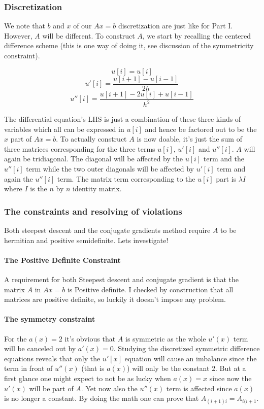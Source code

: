 \documentclass[a4paper,11pt]{article}
\begin{document}
\subsubsection{Discretization}

We note that $b$ and $x$ of our $Ax=b$ discretization are just like for
Part I.  However, $A$ will be different. To construct $A$, we start by
recalling the centered difference scheme (this is one way of doing it,
see discussion of the symmetricity constraint).

\[
  u[i] = u[i]
\]
\[
  u'[i] = \frac{u[i+1]-u[i-1]}{2h}
\]
\[
  u''[i] = \frac{u[i+1]-2u[i]+u[i-1]}{h^2}
\]

The differential equation's LHS is just a combination of these
three kinds of variables which all can be expressed in $u[i]$ and
hence be factored out to be the $x$ part of $Ax=b$. To actually
construct $A$ is now doable, it's just the sum of three matrices
corresponding for the three terms $u[i]$, $u'[i]$ and $u''[i]$. $A$ will
again be tridiagonal. The diagonal will be affected by the $u[i]$ term
and the $u''[i]$ term while the two outer diagonals will be affected by
$u'[i]$ term and again the $u''[i]$ term. The matrix term corresponding
to the $u[i]$ part is $\lambda I$ where $I$ is the $n$ by $n$ identity
matrix.

\subsubsection{The constraints and resolving of violations}

Both steepest descent and the conjugate gradients method require
$A$ to be hermitian and positive semidefinite. Lets investigate!

\paragraph{The Positive Definite Constraint}

A requirement for both Steepest descent and conjugate gradient is that
the matrix $A$ in $Ax=b$ is Positive definite. I checked by construction
that all matrices are positive definite, so luckily it doesn't impose
any problem.

\paragraph{The symmetry constraint}

For the $a(x) = 2$ it's obvious that $A$ is symmetric as the whole
$u'(x)$ term will be canceled out by $a'(x) = 0$. Studying the
discretized symmetric difference equations reveals that only the $u'[x]$
equation will cause an imbalance since the term in front of $u''(x)$
(that is $a(x)$) will only be the constant $2$. But at a first glance
one might expect to not be as lucky when $a(x) = x$ since now the
$u'(x)$ will be part of $A$.  Yet now also the $u''(x)$ term is affected
since $a(x)$ is no longer a constant. By doing the math one can prove
that $A_{(i+1)i} = A_{i(i+1}$.
\end{document}
